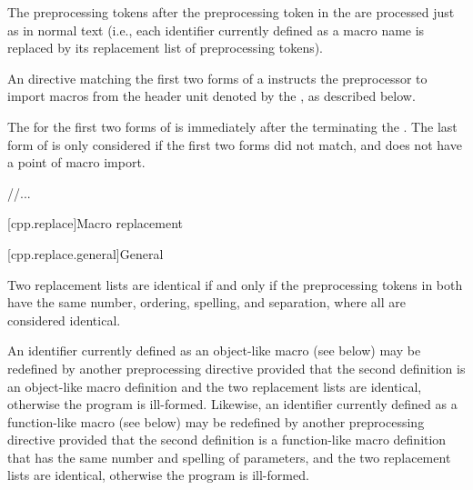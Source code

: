 \documentclass{wg21}
\newcommand{\cwhitespace}[1]{\removed{#1} \added{\grammarterm{whitespace}}}
\newcommand{\clb}[1]{\removed{#1} \added{\grammarterm{line-break}}}
\begin{document}
\pnum
The preprocessing tokens after the  preprocessing token
in the  
are processed just as in normal text
(i.e., each identifier currently defined as a macro name
is replaced by its replacement list of preprocessing tokens).
\begin{note}
    An  directive
    matching the first two forms of a 
    instructs the preprocessor to import macros
    from the header unit
    denoted by the ,
    as described below.
\end{note}
%
The  for the
first two forms of  is
immediately after the \grammarterm{\clb{new-line}} terminating
the .
The last form of  is only considered
if the first two forms did not match, and
does not have a point of macro import.

//...

[cpp.replace]{Macro replacement}%

[cpp.replace.general]{General}%
%
%

\pnum
{}%
Two replacement lists are identical if and only if
the preprocessing tokens in both have
the same number, ordering, spelling, and \cwhitespace{whitespace} separation,
where all  are considered identical.

\pnum
An identifier currently defined as an
%
object-like macro (see below) may be redefined by another
preprocessing directive provided that the second definition is an
object-like macro definition and the two replacement lists
are identical, otherwise the program is ill-formed.
Likewise, an identifier currently defined as a
%
function-like macro (see below) may be redefined by another
preprocessing directive provided that the second definition is a
function-like macro definition that has the same number and spelling
of parameters,
and the two replacement lists are identical,
otherwise the program is ill-formed.
\end{document}
